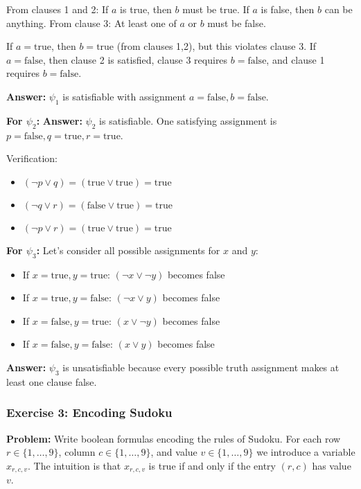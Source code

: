 \documentclass{article}
\begin{document}
From clauses 1 and 2: If $a$ is true, then $b$ must be true. If $a$ is false, then $b$ can be anything.
From clause 3: At least one of $a$ or $b$ must be false.

If $a = \text{true}$, then $b = \text{true}$ (from clauses 1,2), but this violates clause 3.
If $a = \text{false}$, then clause 2 is satisfied, clause 3 requires $b = \text{false}$, and clause 1 requires $b = \text{false}$.

\textbf{Answer:} $\psi_1$ is satisfiable with assignment $a = \text{false}, b = \text{false}$.

\textbf{For $\psi_2$:}
\textbf{Answer:} $\psi_2$ is satisfiable. One satisfying assignment is $p = \text{false}, q = \text{true}, r = \text{true}$.

Verification:
\begin{itemize}
    \item $(\neg p \lor q) = (\text{true} \lor \text{true}) = \text{true}$
    \item $(\neg q \lor r) = (\text{false} \lor \text{true}) = \text{true}$
    \item $(\neg p \lor r) = (\text{true} \lor \text{true}) = \text{true}$
\end{itemize}

\textbf{For $\psi_3$:}
Let's consider all possible assignments for $x$ and $y$:
\begin{itemize}
    \item If $x = \text{true}, y = \text{true}$: $(\neg x \lor \neg y)$ becomes false
    \item If $x = \text{true}, y = \text{false}$: $(\neg x \lor y)$ becomes false
    \item If $x = \text{false}, y = \text{true}$: $(x \lor \neg y)$ becomes false
    \item If $x = \text{false}, y = \text{false}$: $(x \lor y)$ becomes false
\end{itemize}

\textbf{Answer:} $\psi_3$ is unsatisfiable because every possible truth assignment makes at least one clause false.

\subsubsection{Exercise 3: Encoding Sudoku}

\textbf{Problem:} Write boolean formulas encoding the rules of Sudoku. For each row $r \in \{1,\ldots,9\}$, column $c \in \{1,\ldots,9\}$, and value $v \in \{1,\ldots,9\}$ we introduce a variable $x_{r,c,v}$. The intuition is that $x_{r,c,v}$ is true if and only if the entry $(r,c)$ has value $v$.
\end{document}
